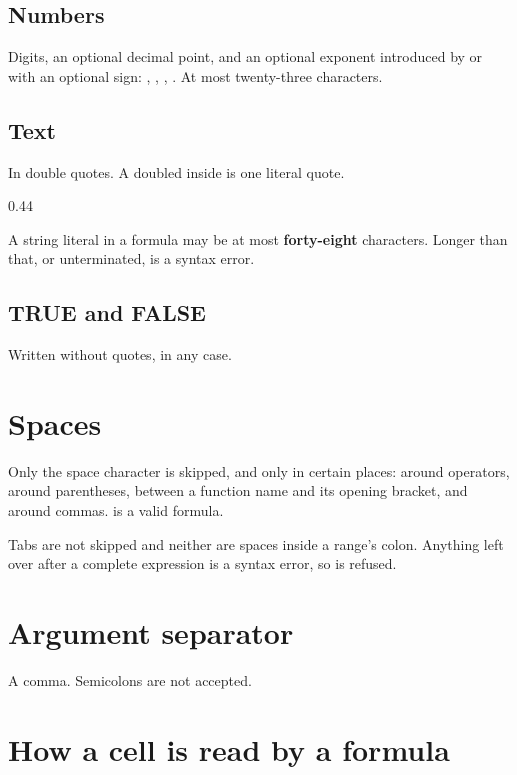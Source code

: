 \subsection{Numbers}

Digits, an optional decimal point, and an optional exponent introduced by
 or  with an optional sign: , , ,
. At most twenty-three characters.

\subsection{Text}

In double quotes. A doubled  inside is one literal quote.

\begin{ccexamples}[]{0.44\linewidth}
\end{ccexamples}

A string literal in a formula may be at most \textbf{forty-eight} characters.
Longer than that, or unterminated, is a syntax error.

\subsection{TRUE and FALSE}

Written without quotes, in any case.

\section{Spaces}

Only the space character is skipped, and only in certain places: around
operators, around parentheses, between a function name and its opening bracket,
and around commas.  is a valid formula.

Tabs are not skipped and neither are spaces inside a range's colon. Anything
left over after a complete expression is a syntax error, so  is
refused.

\section{Argument separator}

A comma. Semicolons are not accepted.

\section{How a cell is read by a formula}

